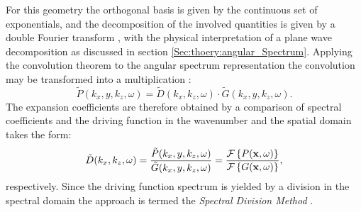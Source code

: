 For this geometry the orthogonal basis is given by the continuous set of exponentials, and the decomposition of the involved quantities is given by a double Fourier transform \cite{Ahrens2012, Arfken2005,Schultz2014:Comparing_approaches}, with the physical interpretation of a plane wave decomposition as discussed in section \ref{Sec:thoery:angular_Spectrum}.
Applying the convolution theorem to the angular spectrum representation the convolution may be transformed into a multiplication \cite{Girod2001}:
\begin{equation}
\tilde{P}(k_x,y,k_z, \omega) = \tilde{D}(k_x,k_z, \omega) \cdot \tilde{G}(k_x,y,k_z, \omega).
\end{equation}
%
The expansion coefficients are therefore obtained by a comparison of spectral coefficients and the driving function in the wavenumber and the spatial domain takes the form:
\begin{equation}
\tilde{D}(k_x,k_z,\omega) = \frac{\tilde{P}(k_x,y,k_z, \omega)}{ \tilde{G}(k_x,y,k_z, \omega)} = 
\frac{\mathcal{F}\left\{ P(\mathbf{x},\omega) \right\} }
{  \mathcal{F}\left\{ G(\mathbf{x},\omega) \right\} },
\label{Eq:Theory:Dkxkz}
\end{equation}
respectively.
Since the driving function spectrum is yielded by a division in the spectral domain the approach is termed the \emph{Spectral Division Method} \cite{Ahrens2010a, Ahrens2012:Ambisonics_for_planar_linear, Ahrens2011:icassp, Ahrens2010:Ambisonics_w_planar_linear}.

